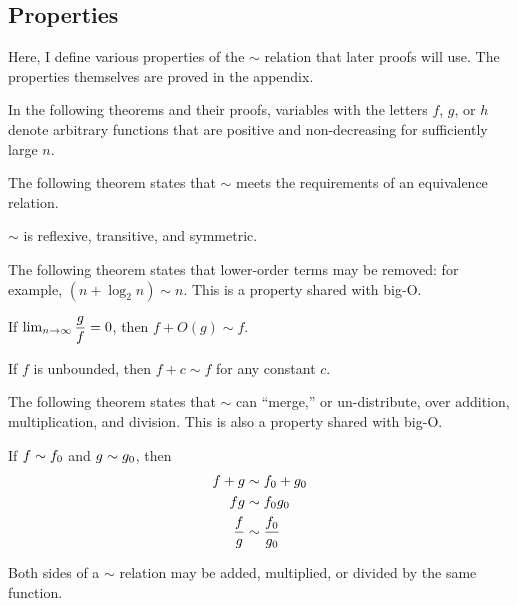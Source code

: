 \subsection{Properties}
\label{subsec:AsymptoticProperties}

Here, I define various properties of the $\sim$ relation that later proofs will use. The properties themselves are proved in the appendix.

In the following theorems and their proofs, variables with the letters $f$, $g$, or $h$ denote arbitrary functions that are positive and non-decreasing for sufficiently large $n$.

The following theorem states that $\sim$ meets the requirements of an equivalence relation.

\begin{theorem}
\label{thm:EquivalenceRelation}
	$\sim$ is reflexive, transitive, and symmetric.
\end{theorem}

The following theorem states that lower-order terms may be removed: for example, $(n + \log_2 n) \sim n$. This is a property shared with big-O.

\begin{theorem}
\label{thm:RemovesLowerOrderTerms}
	If $\lim_{n \to \infty} \dfrac{g}{f} = 0$, then $f + O(g) \sim f$.
\end{theorem}

\begin{corollary}
\label{coro:PlusConstant}
	If $f$ is unbounded, then $f + c \sim f$ for any constant $c$.
\end{corollary}

The following theorem states that $\sim$ can ``merge,'' or un-distribute, over addition, multiplication, and division. This is also a property shared with big-O.

\begin{theorem}
\label{thm:MergesOverOps}
	If $f \sim f_0$ and $g \sim g_0$, then
	\begin{align*}
	f + g &\sim f_0 + g_0\\
	fg &\sim f_0g_0\\
	\frac{f}{g} &\sim \frac {f_0} {g_0}
	\end{align*}
\end{theorem}

\begin{corollary}
\label{coro:BothSides}
	Both sides of a $\sim$ relation may be added, multiplied, or divided by the same function.
\end{corollary}


